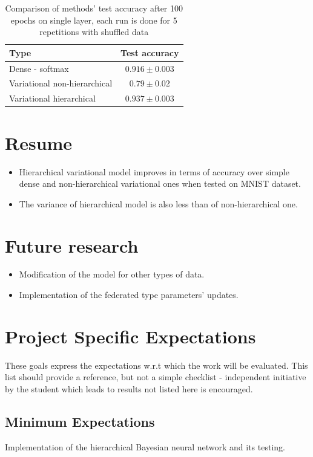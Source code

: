 \documentclass{article}
\begin{document}
\begin{table}[!]
	\centering
	\begin{tabular}{|l|c|}
		\hline
		Type & Test accuracy \\ \hline
		Dense - softmax & $0.916 \pm 0.003$ \\
		Variational non-hierarchical & $0.79 \pm 0.02$
		\\
		Variational hierarchical & $0.937 \pm 0.003$\\ \hline
	\end{tabular}
\caption {Comparison of methods' test accuracy after 100 epochs on single layer, each run is done for 5 repetitions with shuffled data}
\label{table_res}
\end{table}

\section*{Resume}
\begin{itemize}
    \item Hierarchical variational model improves in terms of accuracy over simple dense and non-hierarchical variational ones when tested on MNIST dataset.
    \item The variance of hierarchical model is also less than of non-hierarchical one. 
\end{itemize}
\section*{Future research}
\begin{itemize}
    \item Modification of the model for other types of data.
    \item Implementation of the federated type parameters' updates.
\end{itemize}
\newpage
 \section*{Project Specific Expectations}
These goals express the expectations w.r.t which the work will be evaluated. This list should provide a reference, but not a simple checklist - independent initiative by the student which leads to results not listed here is encouraged. 

\subsection*{Minimum Expectations}
Implementation of the hierarchical Bayesian neural network \cite{Gestures} and its testing.
\end{document}
